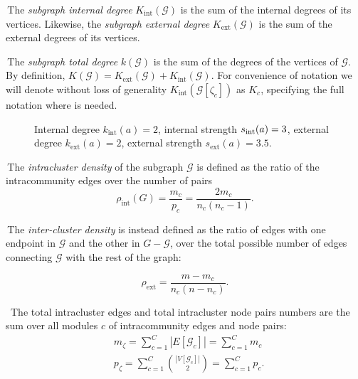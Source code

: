\noindent\textbullet \,The \emph{subgraph internal degree} $K_{\textrm{int}}(\mathcal{G})$ is the sum of the internal degrees of its vertices.
Likewise, the \emph{subgraph external degree} $K_{\textrm{ext}}(\mathcal{G})$ is the sum of the external degrees of its vertices.

\noindent\textbullet \,The \emph{subgraph total degree} $k(\mathcal{G})$ is the sum of the degrees of the vertices of $\mathcal{G}$.
By definition, $K(\mathcal{G}) = K_{\textrm{ext}}(\mathcal{G}) + K_{\textrm{int}}(\mathcal{G})$.
For convenience of notation we will denote without loss of generality $K_{\textrm{int}}(\mathcal{G}[ \zeta_c ])$ as $K_c$, specifying the full notation where is needed.

\begin{figure}[htb]\centering
{}
\caption{Internal degree $k_{\textrm{int}}(a)=2$, internal strength $s_{\textrm{\textrm{int}}}(a)=3$, external degree $k_{\textrm{ext}}(a)=2$, external strength $s_{\textrm{ext}}(a)=3.5$.}
\label{fig:internaldegree}
\end{figure}

\noindent\textbullet \,The \emph{intracluster density} of the subgraph $\mathcal{G}$ is defined as the ratio of the intracommunity edges over the number of pairs 
\begin{equation}
\rho_{\textrm{int}}(G)=\frac{m_c}{p_c} = \frac{2 m_c}{n_c(n_c-1)}.
\end{equation}

\noindent\textbullet \,The \emph{inter-cluster density} is instead defined as the ratio of edges with one endpoint in $\mathcal{G}$ and the other in $G-\mathcal{G}$, over the total possible number of edges connecting $\mathcal{G}$ with the rest of the graph: 

\begin{equation}
\rho_{\textrm{ext}}=\frac{m-m_c}{n_c(n-n_c)}.
\end{equation}

\noindent\textbullet \, The total intracluster edges and total intracluster node pairs numbers are the sum over all modules $c$ of intracommunity edges and node pairs:
\begin{align}
&m_\zeta= \sum \limits_{c=1}^C |E \left[ \mathcal{G}_c \right]| = \sum \limits_{c=1}^C m_c \\
&p_\zeta= \sum \limits_{c=1}^C \binom{|V \left[ \mathcal{G}_c \right]|}{2} = \sum \limits_{c=1}^C p_c.
\end{align}

